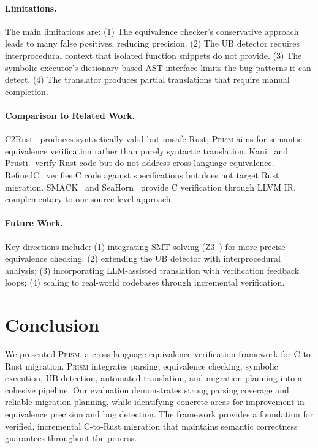 \documentclass[11pt,a4paper]{article}
\begin{document}
\paragraph{Limitations.} The main limitations are:
(1) The equivalence checker's conservative approach leads to many
false positives, reducing precision.
(2) The UB detector requires interprocedural context that isolated
function snippets do not provide.
(3) The symbolic executor's dictionary-based AST interface limits
the bug patterns it can detect.
(4) The translator produces partial translations that require
manual completion.

\paragraph{Comparison to Related Work.}
C2Rust~\cite{c2rust2019} produces syntactically valid but unsafe Rust;
\textsc{Prism} aims for semantic equivalence verification rather than
purely syntactic translation. Kani~\cite{kani2022} and
Prusti~\cite{astrauskas2022prusti} verify Rust code but do not
address cross-language equivalence. RefinedC~\cite{sammler2021refinedc}
verifies C code against specifications but does not target Rust
migration. SMACK~\cite{rakamaric2014smack} and
SeaHorn~\cite{gurfinkel2015seahorn} provide C verification through
LLVM IR, complementary to our source-level approach.

\paragraph{Future Work.} Key directions include:
(1) integrating SMT solving (Z3~\cite{demoura2008z3}) for more
precise equivalence checking;
(2) extending the UB detector with interprocedural analysis;
(3) incorporating LLM-assisted translation with verification
feedback loops;
(4) scaling to real-world codebases through incremental verification.


\section{Conclusion}\label{sec:conclusion}

We presented \textsc{Prism}, a cross-language equivalence verification
framework for C-to-Rust migration. \textsc{Prism} integrates parsing,
equivalence checking, symbolic execution, UB detection, automated
translation, and migration planning into a cohesive pipeline. Our
evaluation demonstrates strong parsing coverage and reliable migration
planning, while identifying concrete areas for improvement in
equivalence precision and bug detection. The framework provides a
foundation for verified, incremental C-to-Rust migration that
maintains semantic correctness guarantees throughout the process.
\end{document}

